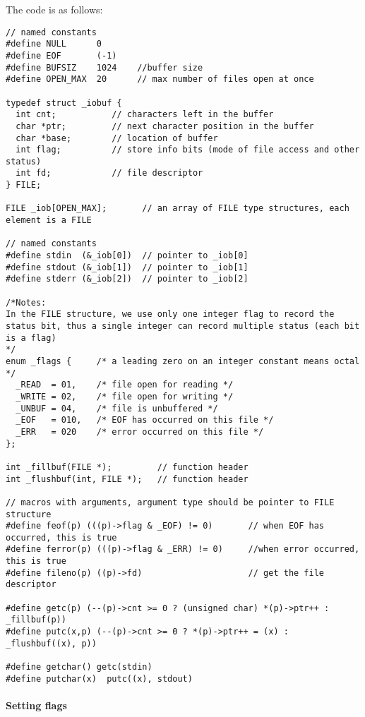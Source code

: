 \documentclass[11pt]{article}
\begin{document}
The code is as follows:
\begin{verbatim}
// named constants
#define NULL      0
#define EOF       (-1)
#define BUFSIZ    1024    //buffer size
#define OPEN_MAX  20      // max number of files open at once

typedef struct _iobuf {
  int cnt;           // characters left in the buffer
  char *ptr;         // next character position in the buffer
  char *base;        // location of buffer 
  int flag;          // store info bits (mode of file access and other status)
  int fd;            // file descriptor
} FILE;

FILE _iob[OPEN_MAX];       // an array of FILE type structures, each element is a FILE

// named constants
#define stdin  (&_iob[0])  // pointer to _iob[0]
#define stdout (&_iob[1])  // pointer to _iob[1]
#define stderr (&_iob[2])  // pointer to _iob[2]

/*Notes: 
In the FILE structure, we use only one integer flag to record the status bit, thus a single integer can record multiple status (each bit is a flag)
*/
enum _flags {     /* a leading zero on an integer constant means octal */
  _READ  = 01,    /* file open for reading */
  _WRITE = 02,    /* file open for writing */
  _UNBUF = 04,    /* file is unbuffered */
  _EOF   = 010,   /* EOF has occurred on this file */
  _ERR   = 020    /* error occurred on this file */
};

int _fillbuf(FILE *);         // function header
int _flushbuf(int, FILE *);   // function header

// macros with arguments, argument type should be pointer to FILE structure
#define feof(p) (((p)->flag & _EOF) != 0)       // when EOF has occurred, this is true
#define ferror(p) (((p)->flag & _ERR) != 0)     //when error occurred, this is true
#define fileno(p) ((p)->fd)                     // get the file descriptor

#define getc(p) (--(p)->cnt >= 0 ? (unsigned char) *(p)->ptr++ : _fillbuf(p))
#define putc(x,p) (--(p)->cnt >= 0 ? *(p)->ptr++ = (x) : _flushbuf((x), p))

#define getchar() getc(stdin)
#define putchar(x)  putc((x), stdout)
\end{verbatim}


\paragraph{Setting flags}
\label{sec:org3d9406a}
\end{document}
